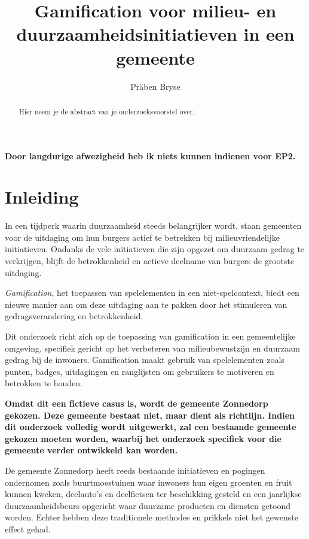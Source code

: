 \documentclass{hogent-article}
\title{Gamification voor milieu- en duurzaamheidsinitiatieven in een gemeente}
\author{Präben Bryse}
\begin{document}
\begin{abstract}
  Hier neem je de abstract van je onderzoeksvoorstel over.
\end{abstract}

\tableofcontents

\bigskip

%
\paragraph{Door langdurige afwezigheid heb ik niets kunnen indienen voor EP2.}
%

\section{Inleiding}%
\label{sec:inleiding}

In een tijdperk waarin duurzaamheid steeds belangrijker wordt, staan gemeenten voor de uitdaging om hun burgers actief te betrekken bij milieuvriendelijke initiatieven. Ondanks de vele initiatieven die zijn opgezet om duurzaam gedrag te verkrijgen, blijft de betrokkenheid en actieve deelname van burgers de grootste uitdaging. 

\emph{Gamification}, het toepassen van spelelementen in een niet-spelcontext, biedt een nieuwe manier aan om deze uitdaging aan te pakken door het stimuleren van gedragsverandering en betrokkenheid.

Dit onderzoek richt zich op de toepassing van gamification in een gemeentelijke omgeving, specifiek gericht op het verbeteren van milieubewustzijn en duurzaam gedrag bij de inwoners. Gamification maakt gebruik van spelelementen zoals punten, badges, uitdagingen en ranglijsten om gebruikers te motiveren en betrokken te houden.

\textbf{Omdat dit een fictieve casus is, wordt de gemeente Zonnedorp gekozen. Deze gemeente bestaat niet, maar dient als richtlijn. Indien dit onderzoek volledig wordt uitgewerkt, zal een bestaande gemeente gekozen moeten worden, waarbij het onderzoek specifiek voor die gemeente verder ontwikkeld kan worden.} 

De gemeente Zonnedorp heeft reeds bestaande initiatieven en pogingen ondernomen zoals buurtmoestuinen waar inwoners hun eigen groenten en fruit kunnen kweken, deelauto's en deelfietsen ter beschikking gesteld en een jaarlijkse duurzaamheidsbeurs opgericht waar duurzame producten en diensten getoond worden. Echter hebben deze traditionele methodes en prikkels niet het gewenste effect gehad. 
\end{document}
